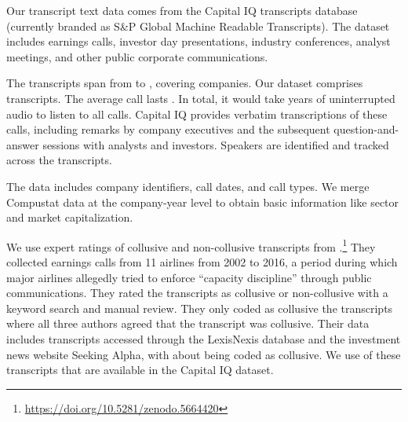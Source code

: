 Our transcript text data comes from the Capital IQ transcripts database 
(currently branded as S\&P Global Machine Readable Transcripts). The 
dataset includes earnings calls, investor day presentations, industry 
conferences, analyst meetings, and other public corporate communications.

The transcripts span from  
to , covering
  companies.
  Our dataset comprises  
  transcripts. The average call lasts . 
  In total, it would take  
  years of uninterrupted audio to listen to all calls. Capital IQ provides 
  verbatim transcriptions of these calls, including remarks by company 
  executives and the subsequent question-and-answer sessions with analysts 
  and investors. Speakers are identified and tracked across the transcripts.

The data includes company identifiers, call dates, and call types. 
We merge Compustat data at the company-year level to obtain basic 
information like sector and market capitalization.



We use expert ratings of collusive and non-collusive transcripts from
 \textcite{aryal2022coordinated}.\footnote{\url{https://doi.org/10.5281/zenodo.5664420}} 
 They collected earnings calls from 11 airlines from 2002 to 2016, a 
 period during which major airlines allegedly tried to enforce ``capacity discipline'' 
 through public communications. They rated the transcripts as collusive
 or non-collusive with a keyword search and manual review. They only 
 coded as collusive the transcripts where all three authors agreed that 
 the transcript was collusive. Their data includes 
 transcripts accessed through the LexisNexis database and the investment 
 news website Seeking Alpha, with about  
 being coded as collusive. We use  
 of these transcripts that are available in the Capital IQ dataset.
